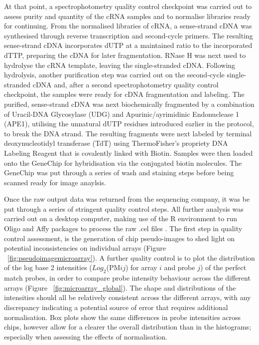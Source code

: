At that point, a spectrophotometry quality control checkpoint was carried out to assess purity and quantity of the cRNA samples and to normalise libraries ready for continuing. From the normalised libraries of cRNA, a sense-strand cDNA was synthesised through reverse transcription and second-cycle primers. The resulting sense-strand cDNA incorporates dUTP at a maintained ratio to the incorporated dTTP, preparing the cDNA for later fragmentation. RNase H was next used to hydrolyse the cRNA template, leaving the single-stranded cDNA. Following hydrolysis, another purification step was carried out on the second-cycle single-stranded cDNA and, after a second spectrophotometry quality control checkpoint, the samples were ready for cDNA fragmentation and labeling. The purified, sense-strand cDNA was next biochemically fragmented by a combination of Uracil-DNA Glycosylase (UDG) and Apurinic/ayrimidinic Endonuclease 1 (APE1), utilising the unnatural dUTP residues introduced earlier in the protocol, to break the DNA strand. The resulting fragments were next labeled by terminal deoxynucleotidyl transferase (TdT) using ThermoFisher's propriety DNA Labeling Reagent that is covalently linked with Biotin. Samples were then loaded onto the GeneChip for hybridisation via the conjugated biotin molecules. The GeneChip was put through a series of wash and staining steps before being scanned ready for image anaylsis. 

Once the raw output data was returned from the sequencing company, it was be put through a series of stringent quality control steps. All further analysis was carried out on a desktop computer, making use of the R environment to run Oligo and Affy packages to process the raw .cel files \cite{10.1093/bioinformatics/btq431,10.1093/bioinformatics/btg405}. The first step in quality control assessment, is the generation of chip pseudo-images to shed light on potential inconsistencies on individual arrays (Figure ~\ref{fig:pseudoimagemicroarray}). A further quality control is to plot the distribution of the log base 2 intensities ($Log_{2}$(PM$\textit{ij}$) for array $\textit{i}$ and probe $\textit{j}$) of the perfect match probes, in order to compare probe intensity behaviour across the different arrays (Figure ~\ref{fig:microarray_global}). The shape and distributions of the intensities should all be relatively consistent across the different arrays, with any discrepancy indicating a potential source of error that requires additional normalisation. Box plots show the same differences in probe intensities across chips, however allow for a clearer the overall distribution than in the histograms; especially when assessing the effects of normalisation.

